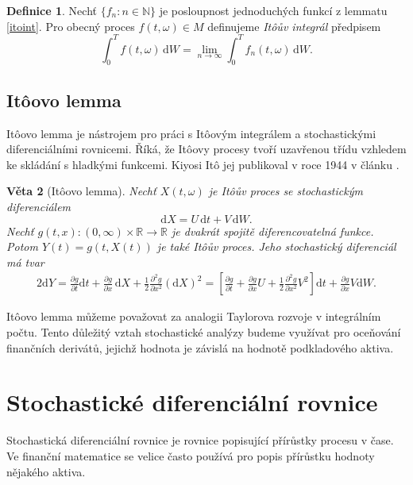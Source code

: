 \documentclass[a4paper,12pt]{report}
\newtheorem{veta}{Věta}
\theoremstyle{definition} \newtheorem{definice}[veta]{Definice}
\theoremstyle{remark}
\begin{document}
\begin{definice}
Nechť $\{f_n:n\in\mathbb N\}$ je posloupnost jednoduchých funkcí z lemmatu \ref{itoint}.
Pro obecný proces $f(t,\omega)\in M$ definujeme \textit{It\^oův integrál} předpisem
$$\int_0^Tf(t,\omega)\,\mathrm{d}W=\lim_{n\to\infty}\int_0^Tf_n(t,\omega)\,\mathrm{d}W.$$
\end{definice}

\subsection{It\^oovo lemma}
It\^oovo lemma je nástrojem pro práci s It\^oovým integrálem a stochastickými diferenciálními rovnicemi.
Říká, že It\^oovy procesy tvoří uzavřenou třídu vzhledem ke skládání s hladkými funkcemi.
Kiyosi It\^o jej publikoval v roce 1944 v článku \cite{ito1944}.
\begin{veta}[It\^oovo lemma]
Nechť $X(t,\omega)$ je It\^oův proces se stochastickým diferenciálem
$$\mathrm{d}X=U\,\mathrm{d}t+V\,\mathrm{d}W.$$
Nechť $g(t,x):(0,\infty)\times\mathbb R\to\mathbb R$ je dvakrát spojitě diferencovatelná funkce.
Potom $Y(t)=g(t,X(t))$ je také It\^oův proces.
Jeho stochastický diferenciál má tvar
\begin{alignat*}{2}
\mathrm{d}Y=\frac{\partial g}{\partial t}\mathrm{d}t+\frac{\partial g}{\partial x}\,\mathrm{d}X+\frac12\frac{\partial^2 g}{\partial x^2}(\mathrm{d}X)^2=\left[\frac{\partial g}{\partial t}+\frac{\partial g}{\partial x}U+\frac12\frac{\partial^2 g}{\partial x^2}V^2\right]\mathrm{d}t+\frac{\partial g}{\partial x}V\mathrm{d}W.
\end{alignat*}
\end{veta}

It\^oovo lemma můžeme považovat za analogii Taylorova rozvoje v integrálním počtu.
Tento důležitý vztah stochastické analýzy budeme využívat pro oceňování finančních derivátů, jejichž hodnota je závislá na hodnotě podkladového aktiva.



\section{Stochastické diferenciální rovnice}
Stochastická diferenciální rovnice je rovnice popisující přírůstky procesu v čase. 
Ve finanční matematice se velice často používá pro popis přírůstku hodnoty nějakého aktiva.
\end{document}
